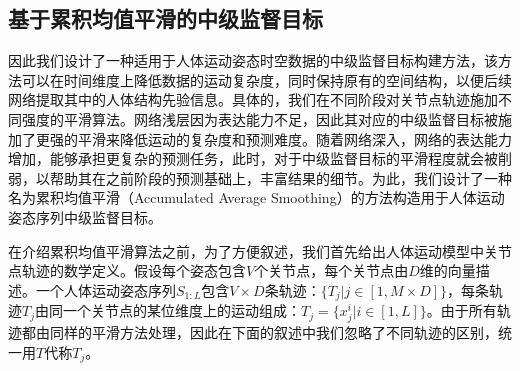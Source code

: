 \subsection{基于累积均值平滑的中级监督目标}
因此我们设计了一种适用于人体运动姿态时空数据的中级监督目标构建方法，该方法可以在时间维度上降低数据的运动复杂度，同时保持原有的空间结构，以便后续网络提取其中的人体结构先验信息。具体的，我们在不同阶段对关节点轨迹施加不同强度的平滑算法。网络浅层因为表达能力不足，因此其对应的中级监督目标被施加了更强的平滑来降低运动的复杂度和预测难度。随着网络深入，网络的表达能力增加，能够承担更复杂的预测任务，此时，对于中级监督目标的平滑程度就会被削弱，以帮助其在之前阶段的预测基础上，丰富结果的细节。为此，我们设计了一种名为累积均值平滑（Accumulated Average Smoothing）的方法构造用于人体运动姿态序列中级监督目标。

在介绍累积均值平滑算法之前，为了方便叙述，我们首先给出人体运动模型中关节点轨迹的数学定义。假设每个姿态包含$V$个关节点，每个关节点由$D$维的向量描述。一个人体运动姿态序列$S_{1:L}$包含$V \times D$条轨迹：$\{T_j|j\in[1, M\times D]\}$，每条轨迹$T_j$由同一个关节点的某位维度上的运动组成：$T_j=\{x^i_j|i\in[1,L]\}$。由于所有轨迹都由同样的平滑方法处理，因此在下面的叙述中我们忽略了不同轨迹的区别，统一用$T$代称$T_j$。

